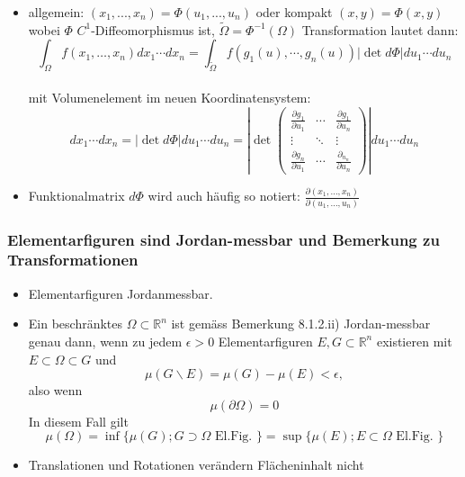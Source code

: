 \documentclass[a3paper, 11pt, landscape]{scrartcl}
\begin{document}
\begin{multicols*}{3}
\begin{itemize}
        \item allgemein: $(x_1,...,x_n)=\Phi(u_1,...,u_n)$ oder kompakt $(x,y)=\Phi(x,y)$ wobei $\Phi$ $C^1$-Diffeomorphismus ist, $\tilde{\Omega}=\Phi^{-1}(\Omega)$ Transformation lautet dann:\\
        $$\int_{\Omega} f\left(x_{1}, \ldots, x_{n}\right) d x_{1} \cdots d x_{n}=\int_{\tilde{\Omega}} f\left(g_{1}(u), \cdots, g_{n}(u)\right)|\operatorname{det} d \Phi| d u_{1} \cdots d u_{n}$$\\
        mit Volumenelement im neuen Koordinatensystem: $$d x_{1} \cdots d x_{n}=|\operatorname{det} d \Phi| d u_{1} \cdots d u_{n}=\left|\operatorname{det}\left(\begin{array}{ccc}
\frac{\partial g_{1}}{\partial u_{1}} & \cdots & \frac{\partial g_{1}}{\partial u_{n}} \\
\vdots & \ddots & \vdots \\
\frac{\partial g_{n}}{\partial u_{1}} & \cdots & \frac{\partial_{n_{n}}}{\partial u_{n}}
\end{array}\right)\right| d u_{1} \cdots d u_{n}$$ 
    \item Funktionalmatrix $d\Phi$ wird auch häufig so notiert: $\frac{\partial\left(x_{1}, \ldots, x_{n}\right)}{\partial\left(u_{1}, \ldots, u_{n}\right)}$
    \end{itemize}
	
	\subsubsection{Elementarfiguren sind Jordan-messbar und Bemerkung zu Transformationen}
	\begin{itemize}
	    \item Elementarfiguren Jordanmessbar.
 \item Ein beschränktes \(\Omega \subset \mathbb{R}^{n}\) ist gemäss Bemerkung 8.1.2.ii) Jordan-messbar genau dann, wenn zu jedem \(\epsilon>0\) Elementarfiguren \(E, G \subset \mathbb{R}^{n}\) existieren mit \(E \subset \Omega \subset G\) und
$$
\mu(G \backslash E)=\mu(G)-\mu(E)<\epsilon,
$$
also wenn
$$
\mu(\partial \Omega)=0
$$
In diesem Fall gilt
$$
\mu(\Omega)=\inf \{\mu(G) ; G \supset \Omega \text { El.Fig. }\}=\sup \{\mu(E) ; E \subset \Omega \text { El.Fig. }\}
$$
    \item Translationen und Rotationen verändern Flächeninhalt nicht
	\end{itemize}
	

\end{multicols*}
\end{document}
